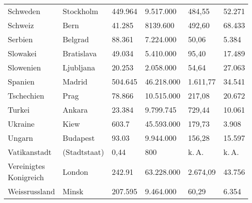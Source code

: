 \documentclass[10pt]{article}
\begin{document}
\begin{longtable}{@{} l l l l l l @{}}
    Schweden & Stockholm & 449.964 & 9.517.000 & 484,55 & 52.271\\
    Schweiz & Bern & 41.285 & 8139.600 & 492,60 & 68.433 \\
    Serbien & Belgrad & 88.361 & 7.224.000 & 50,06 & 5.384\\
    Slowakei & Bratislava & 49.034 & 5.410.000 & 95,40 & 17.489\\
    Slowenien & Ljubljana & 20.253 & 2.058.000 & 54,64 & 27.063\\
    Spanien & Madrid & 504.645 & 46.218.000 & 1.611,77 & 34.541\\
    Tschechien & Prag & 78.866 & 10.515.000 & 217,08 & 20.672\\
    Turkei & Ankara & 23.384 & 9.799.745 & 729,44 & 10.061\\
    Ukraine & Kiew & 603.7 & 45.593.000 & 179,73 & 3.908\\
    Ungarn & Budapest & 93.03 & 9.944.000 & 156,28 & 15.597\\
    Vatikanstadt & (Stadtstaat) & 0,44 & 800 & k.\,A. & k.\,A. \\
    Vereinigtes Konigreich & London & 242.91 & 63.228.000 & 2.674,09 & 43.756\\
    Weissrussland & Minsk & 207.595 & 9.464.000 & 60,29 & 6.354\\


\end{longtable}
\end{document}
